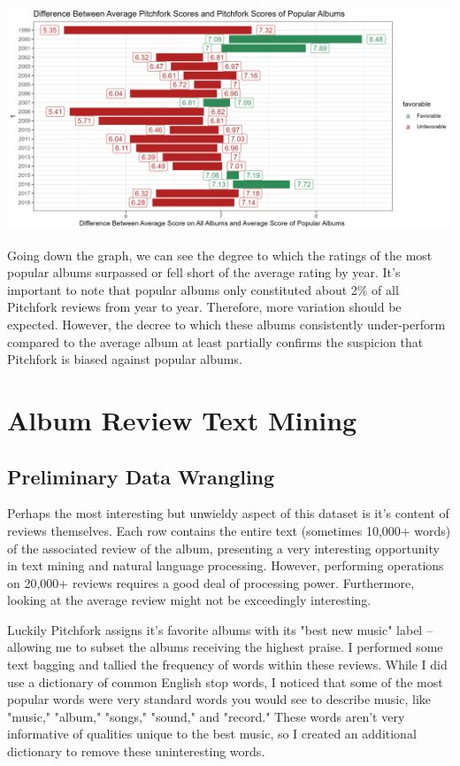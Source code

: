 \documentclass[a4paper,12pt]{article}
\begin{document}
\includegraphics[width = \linewidth]{"figures/contrarian_index_bar.png"}

Going down the graph, we can see the degree to which the ratings of the most popular albums surpassed or fell short of the average rating by year. It's important to note that popular albums only constituted about 2\% of all Pitchfork reviews from year to year. Therefore, more variation should be expected. However, the decree to which these albums consistently under-perform compared to the average album at least partially confirms the suspicion that Pitchfork is biased against popular albums. 

\section{Album Review Text Mining}
\subsection{Preliminary Data Wrangling}
Perhaps the most interesting but unwieldy aspect of this dataset is it's content of reviews themselves. Each row contains the entire text (sometimes 10,000+ words) of the associated review of the album, presenting a very interesting opportunity in text mining and natural language processing. However, performing operations on 20,000+ reviews requires a good deal of processing power. Furthermore, looking at the average review might not be exceedingly interesting.

Luckily Pitchfork assigns it's favorite albums with its "best new music" label -- allowing me to subset the albums receiving the highest praise. I performed some text bagging and tallied the frequency of words within these reviews. While I did use a dictionary of common English stop words, I noticed that some of the most popular words were very standard words you would see to describe music, like "music," "album," "songs," "sound," and "record." These words aren't very informative of qualities unique to the best music, so I created an additional dictionary to remove these uninteresting words. 
\end{document}
